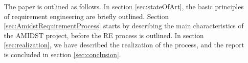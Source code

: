 The paper is outlined as follows. In section  \ref{sec:stateOfArt}, the basic principles of requirement engineering are briefly outlined. Section  \ref{sec:AmidstRequirementProcess} starts by describing the main characteristics of the AMIDST project, before the RE process is outlined. In section  \ref{sec:realization}, we have described the realization of the process, and the report is concluded in section  \ref{sec:conclusion}.

